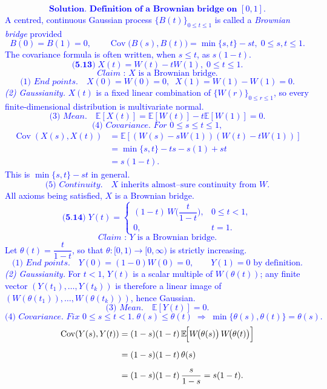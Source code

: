 \documentclass{article}
\begin{document}
\textcolor{blue}{
\[
\textbf{Solution.  Definition of a Brownian bridge on }[0,1].
\]
A centred, continuous Gaussian process $\{B(t)\}_{0\le t\le 1}$ is called a \emph{Brownian bridge} provided  
\[
B(0)=B(1)=0,\qquad 
\operatorname{Cov}\bigl(B(s),B(t)\bigr)=\min\{s,t\}-st,\;0\le s,t\le 1.
\]
The covariance formula is often written, when $s\le t$, as $s(1-t)$.
\[
\textbf{(5.13)}\;X(t)=W(t)-tW(1),\;0\le t\le 1.
\]
\[
\textit{Claim : }X\text{ is a Brownian bridge.}
\]
\[
\textit{(1)  End points.}\quad 
X(0)=W(0)=0,\;\;X(1)=W(1)-W(1)=0.
\]
\textit{(2)  Gaussianity.}\quad 
$X(t)$ is a fixed linear combination of $\{W(r)\}_{0\le r\le 1}$, 
 so every finite‐dimensional distribution is multivariate normal.
\[
\textit{(3)  Mean.}\quad 
\mathbb E[X(t)]=\mathbb E[W(t)]-t\mathbb E[W(1)]=0.
\]
\[
\textit{(4)  Covariance.  For }0\le s\le t\le 1,
\]
\[
\begin{aligned}
\operatorname{Cov}(X(s),X(t))
&=\mathbb E[(W(s)-sW(1))(W(t)-tW(1))] \\[2mm]
&=\min\{s,t\}-t s-s(1)+st \\[1mm]
&=s(1-t).
\end{aligned}
\]
This is $\min\{s,t\}-st$ in general.  
\[
\textit{(5)  Continuity.}\quad 
X\text{ inherits almost–sure continuity from }W.
\]
All axioms being satisfied, $X$ is a Brownian bridge.
\bigskip
\[
\textbf{(5.14)}\;
Y(t)=
\begin{cases}
(1-t)\,W\!\bigl(\dfrac{t}{1-t}\bigr), & 0\le t<1,\\[2mm]
0, & t=1.
\end{cases}
\]
\[
\textit{Claim : }Y\text{ is a Brownian bridge.}
\]
Let $\theta(t)=\dfrac{t}{1-t}$, so that $\theta:[0,1)\to[0,\infty)$ is strictly increasing.
\[
\textit{(1)  End points.}\quad 
Y(0)=(1-0)W(0)=0,\qquad 
Y(1)=0\text{ by definition.}
\]
\textit{(2)  Gaussianity.}\quad 
For $t<1$, $Y(t)$ is a scalar multiple of $W(\theta(t))$; any finite vector $(Y(t_1),\dots,Y(t_k))$
is therefore a linear image of $(W(\theta(t_1)),\dots,W(\theta(t_k)))$, hence Gaussian.
\[
\textit{(3)  Mean.}\quad 
\mathbb E[Y(t)]=0.
\]
\[
\textit{(4)  Covariance.  Fix }0\le s\le t<1.\;
\theta(s)\le\theta(t)\;\Longrightarrow\;
\min\{\theta(s),\theta(t)\}=\theta(s).
\]
\[
\begin{aligned}
\operatorname{Cov}(Y(s),Y(t))
&=(1-s)(1-t)\,
      \mathbb E\!\Bigl[W\!\bigl(\theta(s)\bigr)\,W\!\bigl(\theta(t)\bigr)\Bigr]\\[2mm]
&=(1-s)(1-t)\,\theta(s)\\[2mm]
&=(1-s)(1-t)\,\frac{s}{1-s}=s(1-t).
\end{aligned}
\]}
\end{document}
